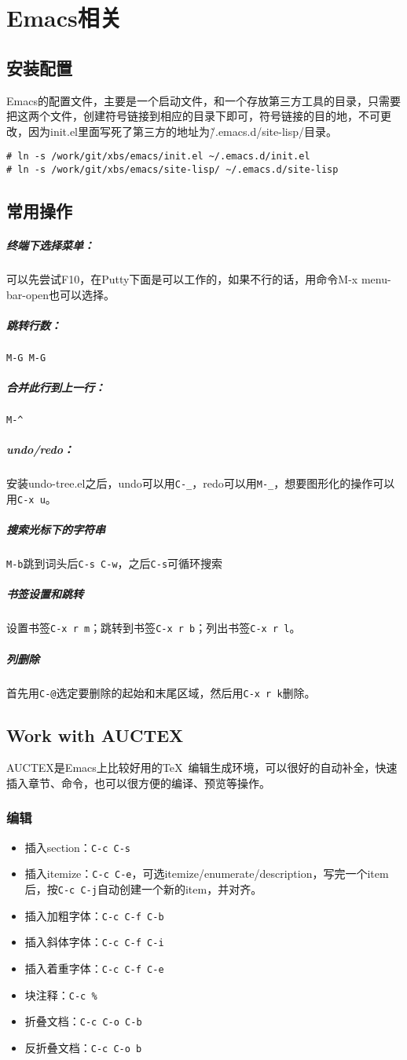 \section{Emacs相关}
\subsection{安装配置}
Emacs的配置文件，主要是一个启动文件，和一个存放第三方工具的目录，只需要把这两个文件，创建符号链接到相应的目录下即可，符号链接的目的地，不可更改，因为init.el里面写死了第三方的地址为\~/.emacs.d/site-lisp/目录。
\begin{lstlisting}[numbers=none]
# ln -s /work/git/xbs/emacs/init.el ~/.emacs.d/init.el
# ln -s /work/git/xbs/emacs/site-lisp/ ~/.emacs.d/site-lisp
\end{lstlisting}

\subsection{常用操作}

\subparagraph{终端下选择菜单：}
可以先尝试F10，在Putty下面是可以工作的，如果不行的话，用命令M-x menu-bar-open也可以选择。
\subparagraph{跳转行数：}
\verb|M-G M-G|
\subparagraph{合并此行到上一行：}
\verb|M-^|
\subparagraph{undo/redo：}
安装undo-tree.el之后，undo可以用\verb|C-_|，redo可以用\verb|M-_|，想要图形化的操作可以用\verb|C-x u|。
\subparagraph{搜索光标下的字符串}
\verb|M-b|跳到词头后\verb|C-s C-w|，之后\verb|C-s|可循环搜索
\subparagraph{书签设置和跳转}
设置书签\verb|C-x r m|；跳转到书签\verb|C-x r b|；列出书签\verb|C-x r l|。
\subparagraph{列删除}
首先用\verb|C-@|选定要删除的起始和末尾区域，然后用\verb|C-x r k|删除。

\subsection{Work with AUCTEX}
\label{sec:work-with-auctex}
AUCTEX是Emacs上比较好用的\TeX~编辑生成环境，可以很好的自动补全，快速插入章节、命令，也可以很方便的编译、预览等操作。
\subsubsection{编辑}
\label{sec:auctex-edit}
\begin{itemize}
\item 插入section：\verb|C-c C-s|
\item 插入itemize：\verb|C-c C-e|，可选itemize/enumerate/description，写完一个item后，按\verb|C-c C-j|自动创建一个新的item，并对齐。
\item 插入加粗字体：\verb|C-c C-f C-b|
\item 插入斜体字体：\verb|C-c C-f C-i|
\item 插入着重字体：\verb|C-c C-f C-e|
\item 块注释：\verb|C-c %|
\item 折叠文档：\verb|C-c C-o C-b|
\item 反折叠文档：\verb|C-c C-o b|
\end{itemize}

